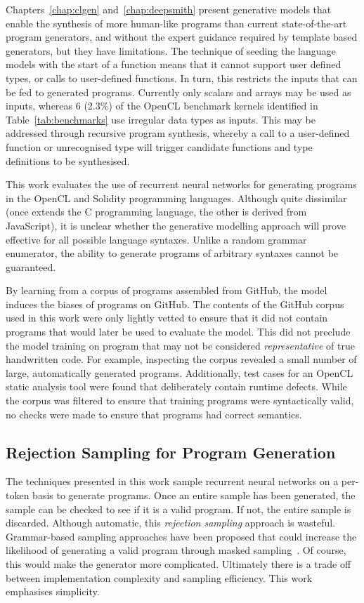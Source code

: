 Chapters~\ref{chap:clgen} and~\ref{chap:deepsmith} present generative models that enable the synthesis of more human-like programs than current state-of-the-art program generators, and without the expert guidance required by template based generators, but they have limitations. The technique of seeding the language models with the start of a function means that it cannot support user defined types, or calls to user-defined functions. In turn, this restricts the inputs that can be fed to generated programs. Currently only  scalars and arrays may be used as inputs, whereas 6 (2.3\%) of the OpenCL benchmark kernels identified in Table~\ref{tab:benchmarks} use irregular data types as inputs. This may be addressed through recursive program synthesis, whereby a call to a user-defined function or unrecognised type will trigger candidate functions and type definitions to be synthesised.

This work evaluates the use of recurrent neural networks for generating programs in the OpenCL and Solidity programming languages. Although quite dissimilar (once extends the C programming language, the other is derived from JavaScript), it is unclear whether the generative modelling approach will prove effective for all possible language syntaxes. Unlike a random grammar enumerator, the ability to generate programs of arbitrary syntaxes cannot be guaranteed.

By learning from a corpus of programs assembled from GitHub, the model induces the biases of programs on GitHub. The contents of the GitHub corpus used in this work were only lightly vetted to ensure that it did not contain programs that would later be used to evaluate the model. This did not preclude the model training on program that may not be considered \emph{representative} of true handwritten code. For example, inspecting the corpus revealed a small number of large, automatically generated programs. Additionally, test cases for an OpenCL static analysis tool were found that deliberately contain runtime defects. While the corpus was filtered to ensure that training programs were syntactically valid, no checks were made to ensure that programs had correct semantics.


\subsection{Rejection Sampling for Program Generation}

The techniques presented in this work sample recurrent neural networks on a per-token basis to generate programs. Once an entire sample has been generated, the sample can be checked to see if it is a valid program. If not, the entire sample is discarded. Although automatic, this \emph{rejection sampling} approach is wasteful. Grammar-based sampling approaches have been proposed that could increase the likelihood of generating a valid program through masked sampling~\cite{Dyer2016}. Of course, this would make the generator more complicated. Ultimately there is a trade off between implementation complexity and sampling efficiency. This work emphasises simplicity.

